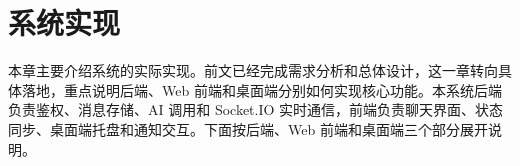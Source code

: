 \makeatletter
{}
\makeatother

\chapter{系统实现}

\newcommand{\chapterfiveplaceholder}[1]{%
\begin{center}
\fbox{\parbox[c][4.0cm][c]{0.82\textwidth}{\centering #1（占位）}}
\end{center}
\begin{center}
#1（占位）
\end{center}
}
\newcommand{\thesiscirclednum}[1]{\ding{\numexpr191+#1\relax}}
\newcommand{\thesisdescitem}[3]{%
\par\addvspace{0.55\baselineskip}%
\noindent\hspace*{2em}\thesiscirclednum{#1}\ #2\par
\vspace{0.1\baselineskip}%
\noindent\hspace*{2em}#3\par
}
\newcommand{\thesisparenitem}[3]{%
\par\addvspace{0.55\baselineskip}%
\noindent\hspace*{2em}（#1）\ #2\par
\vspace{0.1\baselineskip}%
\noindent\hspace*{2em}#3\par
}


本章主要介绍系统的实际实现。前文已经完成需求分析和总体设计，这一章转向具体落地，重点说明后端、Web 前端和桌面端分别如何实现核心功能。本系统后端负责鉴权、消息存储、AI 调用和 Socket.IO 实时通信，前端负责聊天界面、状态同步、桌面端托盘和通知交互\cite{expressdocs2026,socketiodocs2026,electrondocs2026}。下面按后端、Web 前端和桌面端三个部分展开说明。

